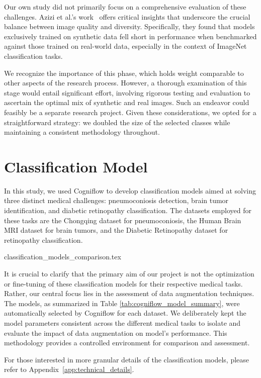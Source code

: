 Our own study did not primarily focus on a comprehensive evaluation of these challenges. Azizi et al.'s work~\cite{azizi2023synthetic} offers critical insights that underscore the crucial balance between image quality and diversity. Specifically, they found that models exclusively trained on synthetic data fell short in performance when benchmarked against those trained on real-world data, especially in the context of ImageNet classification tasks. 

We recognize the importance of this phase, which holds weight comparable to other aspects of the research process. However, a thorough examination of this stage would entail significant effort, involving rigorous testing and evaluation to ascertain the optimal mix of synthetic and real images. Such an endeavor could feasibly be a separate research project. Given these considerations, we opted for a straightforward strategy: we doubled the size of the selected classes while maintaining a consistent methodology throughout.

\section{Classification Model}

In this study, we used Cogniflow to develop classification models aimed at solving three distinct medical challenges: pneumoconiosis detection, brain tumor identification, and diabetic retinopathy classification. The datasets employed for these tasks are the Chongqing dataset for pneumoconiosis, the Human Brain MRI dataset for brain tumors, and the Diabetic Retinopathy dataset for retinopathy classification.

{classification_models_comparison.tex}

It is crucial to clarify that the primary aim of our project is not the optimization or fine-tuning of these classification models for their respective medical tasks. Rather, our central focus lies in the assessment of data augmentation techniques. The models, as summarized in Table \ref{tab:cogniflow_model_summary}, were automatically selected by Cogniflow for each dataset. We deliberately kept the model parameters consistent across the different medical tasks to isolate and evaluate the impact of data augmentation on model's performance. This methodology provides a controlled environment for comparison and assessment.

For those interested in more granular details of the classification models, please refer to Appendix~\ref{app:technical_details}.